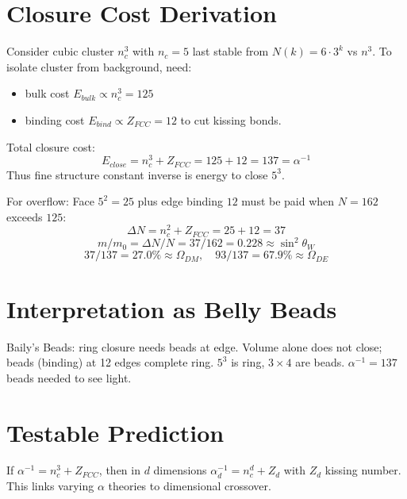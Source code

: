 \documentclass[a4paper,11pt]{article}
\begin{document}
\section{Closure Cost Derivation}
Consider cubic cluster $n_c^3$ with $n_c=5$ last stable from $N(k)=6\cdot3^k$ vs $n^3$.
To isolate cluster from background, need:
\begin{itemize}
\item bulk cost $E_{bulk}\propto n_c^3=125$
\item binding cost $E_{bind}\propto Z_{FCC}=12$ to cut kissing bonds.
\end{itemize}
Total closure cost:
$$\boxed{E_{close}=n_c^3+Z_{FCC}=125+12=137=\alpha^{-1}}$$
Thus fine structure constant inverse is energy to close $5^3$.

For overflow:
Face $5^2=25$ plus edge binding $12$ must be paid when $N=162$ exceeds $125$:
$$\boxed{\Delta N = n_c^2+Z_{FCC}=25+12=37}$$
$$m/m_0 = \Delta N/N = 37/162 = 0.228 \approx \sin^2\theta_W$$
$$37/137=27.0\%\approx\Omega_{DM},\quad 93/137=67.9\%\approx\Omega_{DE}$$

\section{Interpretation as Belly Beads}
Baily's Beads: ring closure needs beads at edge. Volume alone does not close; beads (binding) at 12 edges complete ring. $5^3$ is ring, $3\times4$ are beads. $\alpha^{-1}=137$ beads needed to see light.

\section{Testable Prediction}
If $\alpha^{-1}=n_c^3+Z_{FCC}$, then in $d$ dimensions $\alpha_d^{-1}=n_c^d+Z_d$ with $Z_d$ kissing number. This links varying $\alpha$ theories to dimensional crossover.
\end{document}
